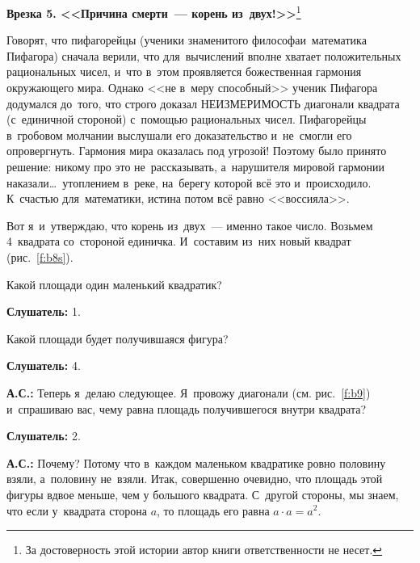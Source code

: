 \medskip

\hrulefill

\smallskip

\textbf{Врезка 5. <<Причина смерти~--- корень из~двух!>>}\footnote{За достоверность этой истории автор книги ответственности не несет.}

Говорят, что пифагорейцы (ученики знаменитого философа\linebreak и~математика Пифагора) сначала верили, что
для~вычислений вполне хватает положительных рациональных чисел, и~что в~этом проявляется
божественная гармония окружающего мира. Однако <<не в~меру способный>> ученик Пифагора додумался
до~того, что строго доказал НЕИЗМЕРИМОСТЬ диагонали квадрата (с~единичной стороной) с~помощью
рациональных чисел. Пифагорейцы в~гробовом молчании выслушали его доказательство и~не~смогли его
опровергнуть. Гармония мира оказалась под угрозой! Поэтому было принято решение: никому про это
не~рассказывать, а~нарушителя мировой гармонии наказали\ldots\ утоплением в~реке, на~берегу которой всё
это и~происходило. К~счастью для~математики, истина потом всё равно <<воссияла>>.

\smallskip

\hrulefill

\medskip

\pagebreak

Вот я~и~утверждаю, что корень из~двух~--- именно такое число. Возьмем 4~квадрата со~стороной
единичка. И~составим из~них новый квадрат (рис.~\ref{f:b8s}).


Какой площади один маленький квадратик?

\textbf{Слушатель:} 1.

Какой площади будет получившаяся фигура?

\textbf{Слушатель:} 4.

\textbf{А.С.:} Теперь я~делаю следующее. Я~провожу диагонали (см. рис.~\ref{f:b9}) и~спрашиваю вас, чему равна
площадь получившегося внутри квадрата?


\textbf{Слушатель:} 2.

\textbf{А.С.:} Почему? Потому что в~каждом маленьком квадратике ровно половину взяли, а~половину не~взяли.
Итак, совершенно очевидно, что площадь этой фигуры вдвое меньше, чем у большого квадрата. С~другой
стороны, мы знаем, что если у~квадрата сторона $a$, то площадь его равна $a\cdot a=a^{2}$.

